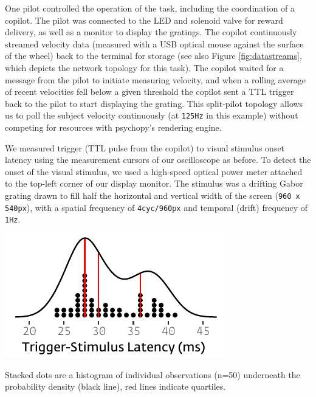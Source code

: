 One pilot controlled the operation of the task, including the coordination of a copilot. The pilot was connected to the LED and solenoid valve for reward delivery, as well as a monitor to display the gratings. The copilot continuously streamed velocity data (measured with a USB optical mouse against the surface of the wheel) back to the terminal for storage (see also Figure \ref{fig:datastreams}, which depicts the network topology for this task). The copilot waited for a message from the pilot to initiate measuring velocity, and when a rolling average of recent velocities fell below a given threshold the copilot sent a TTL trigger back to the pilot to start displaying the grating. This split-pilot topology allows us to poll the subject velocity continuously (at \texttt{125Hz} in this example) without competing for resources with psychopy's rendering engine.

We measured trigger (TTL pulse from the copilot) to visual stimulus onset latency using the measurement cursors of our oscilloscope as before. To detect the onset of the visual stimulus, we used a high-speed optical power meter attached to the top-left corner of our display monitor. The stimulus was a drifting Gabor grating drawn to fill half the horizontal and vertical width of the screen (\texttt{960 x 540px}), with a spatial frequency of \texttt{4cyc/960px} and temporal (drift) frequency of \texttt{1Hz}.

\begin{marginfigure}[-0cm]
\includegraphics[]{figures/test_6_visual_lags.pdf}
\caption{Stacked dots are a histogram of individual observations (n=50) underneath the probability density (black line), red lines indicate quartiles.}
\label{fig:vidlat}
\end{marginfigure}

